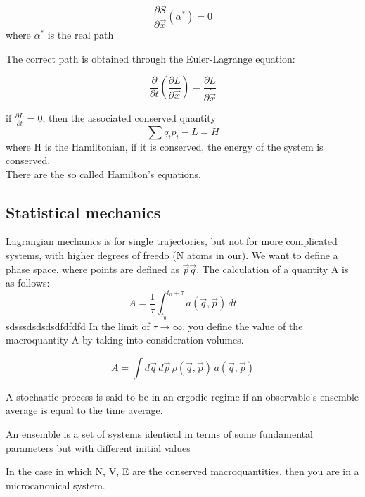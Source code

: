 $$
\frac{\partial S}{\partial \vec{x}}(\alpha^*) = 0
$$
where $\alpha^*$ is the real path

The correct path is obtained through the Euler-Lagrange equation:

\begin{equation}
    \frac{\partial}{\partial t} \left(\frac{\partial L}{\partial \vec{x}}\right) = \frac{\partial L}{\partial \dot{\vec{x}}}
\end{equation}

if $\frac{\partial L}{\partial t} = 0$, then the associated conserved quantity
$$
\sum{q_i p_i} - L = H
$$
where H is the Hamiltonian, if it is conserved, the energy of the system is conserved.\\
There are the so called Hamilton's equations.

\subsection{Statistical mechanics}
Lagrangian mechanics is for single trajectories, but not for more complicated systems, with higher degrees of freedo (N atoms in our).
We want to define a phase space, where points are defined as $\vec{p} \vec{q}$. The calculation of a quantity A is as follows:
$$
A = \frac{1}{\tau} \int_{t_0}^{t_0+\tau} a(\vec{q}, \vec{p}) \, dt
$$
sdsssdsdsdsdfdfdfd
In the limit of $\tau \rightarrow \infty$, you define the value of the macroquantity A by taking into consideration volumes.

$$
A = \int d\vec{q} \, d\vec{p} \, \rho(\vec{q}, \vec{p}) \, a(\vec{q}, \vec{p})
$$




\begin{definition}
    A stochastic process is said to be in an ergodic regime if an observable's ensemble average is equal to the time average.
\end{definition}

An ensemble is a set of systems identical in terms of some fundamental parameters but with different initial values

In the case in which N, V, E are the conserved macroquantities, then you are in a microcanonical system.